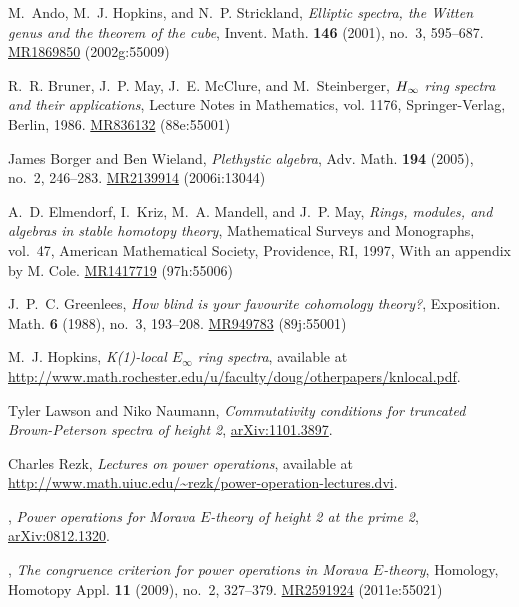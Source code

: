 \documentclass{gtpart}
\theoremstyle{definition}
\theoremstyle{remark}
\begin{document}
\newcommand{\MRn}[2]{\href{http://www.ams.org/mathscinet-getitem?mr=#1}{MR#1} #2}
\begin{thebibliography}

M.~Ando, M.~J. Hopkins, and N.~P. Strickland, \emph{Elliptic spectra, the
  {W}itten genus and the theorem of the cube}, Invent. Math. \textbf{146}
  (2001), no.~3, 595--687. \MRn{1869850}{(2002g:55009)}

R.~R. Bruner, J.~P. May, J.~E. McClure, and M.~Steinberger, \emph{{$H\sb \infty
  $} ring spectra and their applications}, Lecture Notes in Mathematics, vol.
  1176, Springer-Verlag, Berlin, 1986. \MRn{836132}{(88e:55001)}

James Borger and Ben Wieland, \emph{Plethystic algebra}, Adv. Math.
  \textbf{194} (2005), no.~2, 246--283. \MRn{2139914}{(2006i:13044)}

A.~D. Elmendorf, I.~Kriz, M.~A. Mandell, and J.~P. May, \emph{Rings, modules,
  and algebras in stable homotopy theory}, Mathematical Surveys and Monographs,
  vol.~47, American Mathematical Society, Providence, RI, 1997, With an
  appendix by M. Cole. \MRn{1417719}{(97h:55006)}

J.~P.~C. Greenlees, \emph{How blind is your favourite cohomology theory?},
  Exposition. Math. \textbf{6} (1988), no.~3, 193--208. \MRn{949783}{(89j:55001)}

M.~J. Hopkins, \emph{K(1)-local ${E}_\infty$ ring spectra}, available at
  \url{http://www.math.rochester.edu/u/faculty/doug/otherpapers/knlocal.pdf}.

Tyler Lawson and Niko Naumann, \emph{Commutativity conditions for truncated
  {B}rown-{P}eterson spectra of height 2}, \href{http://arxiv.org/abs/1101.3897}{arXiv:1101.3897}.

Charles Rezk, \emph{Lectures on power operations}, available at
  \url{http://www.math.uiuc.edu/~rezk/power-operation-lectures.dvi}.

\bysame, \emph{Power operations for {M}orava ${E}$-theory of height 2 at the
  prime 2}, \href{http://arxiv.org/abs/0812.1320}{arXiv:0812.1320}.

\bysame, \emph{The congruence criterion for power operations in {M}orava
  {$E$}-theory}, Homology, Homotopy Appl. \textbf{11} (2009), no.~2, 327--379.
  \MRn{2591924}{(2011e:55021)}


\end{thebibliography}
\end{document}
